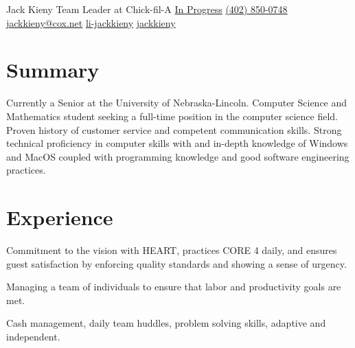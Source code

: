 \documentclass[]{latex/resume}
\begin{document}
%
%

\namesection
    {Jack}
    {Kieny}
    {Team Leader at Chick-fil-A}
    {\contactline
        {\href{}{In Progress}}
        {\href{tel:+1402850047}{(402) 850-0748}}
        {\href{mailto:jackkieny@cox.net}{jackkieny@cox.net}}
        {\href{https://www.linkedin.com/in/jackkieny}{li-jackkieny}}
        {\href{https://www.github.com/jackkieny}{jackkieny}}
    }       
        

%
%

\begin{minipage}[t]{0.75\textwidth} 

\section{Summary}
Currently a Senior at the University of Nebraska-Lincoln. Computer Science and Mathematics student seeking a full-time position in the computer science field. 
Proven history of customer service and competent communication skills. 
Strong technical proficiency in computer skills with and in-depth knowledge of Windows and MacOS coupled with programming knowledge and good software engineering practices.

\sectionsep


\section{Experience}
     
    \vspace{\topsep} %
    \begin{tightemize}
        \sectionsep
            \item Commitment to the vision with HEART, practices CORE 4 daily, and ensures guest satisfaction by enforcing quality standards and showing a sense of urgency.
            \item Managing a team of individuals to ensure that labor and productivity goals are met.
            \item Cash management, daily team huddles, problem solving skills, adaptive and independent.
    \end{tightemize}
    

\end{minipage}
\end{document}
